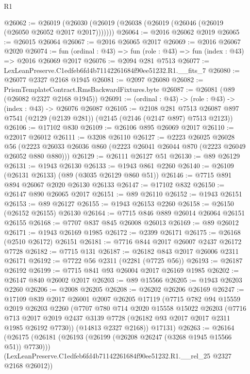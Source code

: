 \begin{lexlean}{R1}
\begin{coremodule}
@26062 := @26019 (@26030 (@26019 (@26038 (@26019 (@26046 (@26019 (@26050 @26052 @2017 @2017)))))))
@26064 := @2016 @26062 @2019
@26065 := @26015 @26064
@26067 := @2016 @26065 @2017
@26069 := @2016 @26067 @2020
@26074 := fun (ordinal : @43) => fun (role : @43) => fun (index : @43) => @2016 @26069 @2017
@26076 := @2094 @281 @7513
@26077 := LexLeanPreserve.C1edfeb6fd4b71142261684f90ee51232.R1.__fits_7
@26080 := @26077 @2327 @2168 @1945
@26081 := @2097 @26080
@26082 := PrismTemplateContract.RmsBackwardFixtures.byte
@26087 := @26081 (@89 (@26082 @2327 @2168 @1945))
@26091 := (ordinal : @43) -> (role : @43) -> (index : @43) -> @26076 @26087
@26105 := @2108
    @281
    @7513
    @26087
    @897
    @7541
    (@2129 (@2139 @281))
    (@2145 (@2146 (@2147 @897) @7513 @2123))
@26106 := @17102 @830
@26109 := @26106 @895 @26069 @2017
@26110 := @22017 @26012
@26111 := @3208 @26110
@26127 := @2223
    @26025
    @26028
    @56
    (@2223 @26033 @26036 @860 (@2223 @26041 @26044 @870 (@2223 @26049 @26052 @880 @880)))
@26129 := @26111 @26127 @51
@26130 := @89 @26129
@26131 := @1943 @26130
@26133 := @1943 @861 @2260
@26140 := @26109 (@26131 @26133) (@89 (@3035 @26129 @860 @51))
@26146 := @7715 @891 @894 @26067 @2020 @26130 @26133
@26147 := @17102 @832
@26150 := @26147 @890 @26065 @2017
@26151 := @89 @26110
@26152 := @1943 @26151
@26153 := @89 @26127
@26155 := @1943 @26153 @2260
@26158 := @26150 (@26152 @26155) @26130
@26164 := @7715 @846 @889 @26014 @26064 @26151 @26155
@26168 := @7707 @837 @845 @26008 @26013
@26169 := @89 @26012
@26171 := @1943 @26169 @1985
@26172 := @2399 @26171
@26175 := @26168 (@2510 @26172) @26151
@26181 := @7716 @844 @2017 @26007 @2437 @26172 @7728
@26182 := @7715 @131
@26187 := @26182 @843 @2017 @26006 @2311 @26171
@26192 := @7722 @56 @2311 (@2281 (@7725 @56))
@26193 := @26187 @26192
@26199 := @7715 @841 @93 @26004 @2017 @26169 @1985
@26202 := @26147 @840 @26002 @2017
@26203 := @89 @15566
@26205 := @1943 @26203 @2260
@26206 := @2008 @26205
@26208 := @26202 @26206 @26169
@26247 := @17109
    @839
    @2017
    @26001
    @2007
    @26205
    @17119
    (@7715
      @782
      @94
      @15559
      @2019
      @26203
      @2260
      (@7707
        @780
        @714
        @2020
        @15558
        @15022
        @26203
        (@7716 @713 @2017 @2019 @2437 @3139 @7728 (@26182 @93 @2017 @2017 @2311 @1985 @26192 @7730))
        (@14813 @2327 @2168))
      @17131)
@26263 := @26164
    (@26175
      (@26181 (@26193 (@26199 (@26208 @26247 (@3268 @1945 @15566 @51)) @7730)))
      (LexLeanPreserve.C1edfeb6fd4b71142261684f90ee51232.R1.__rel_25 @2327 @2168 @26012))

\end{coremodule}
\end{lexlean}
